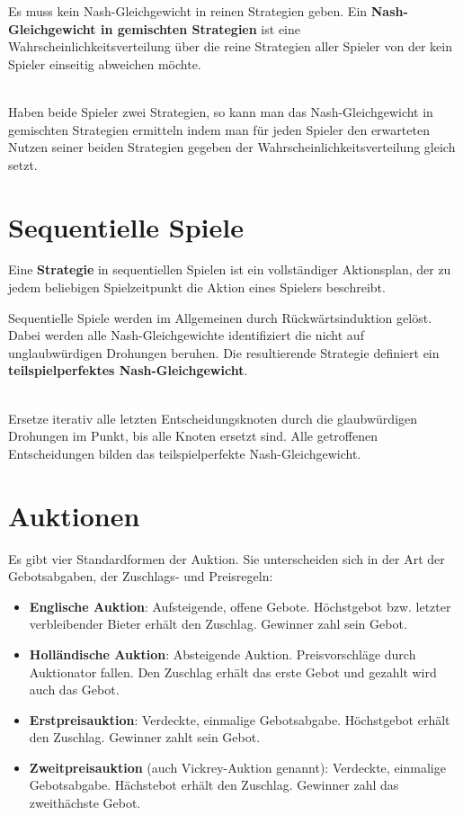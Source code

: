 Es muss kein Nash-Gleichgewicht in reinen Strategien geben. Ein \textbf{Nash-Gleichgewicht in gemischten Strategien} ist eine Wahrscheinlichkeitsverteilung über die reine Strategien aller Spieler von der kein Spieler einseitig abweichen möchte. 

\begin{kr} ~\\
	Haben beide Spieler zwei Strategien, so kann man das Nash-Gleichgewicht in gemischten Strategien ermitteln indem man für jeden Spieler den erwarteten Nutzen seiner beiden Strategien gegeben der Wahrscheinlichkeitsverteilung gleich setzt.
\end{kr}

\section{Sequentielle Spiele}

Eine \textbf{Strategie} in sequentiellen Spielen ist ein vollständiger Aktionsplan, der zu jedem beliebigen Spielzeitpunkt die Aktion eines Spielers beschreibt.

Sequentielle Spiele werden im Allgemeinen durch Rückwärtsinduktion gelöst. Dabei werden alle Nash-Gleichgewichte identifiziert die nicht auf unglaubwürdigen Drohungen beruhen. Die resultierende Strategie definiert ein \textbf{teilspielperfektes Nash-Gleichgewicht}.

\begin{kr} ~\\
	Ersetze iterativ alle letzten Entscheidungsknoten durch die glaubwürdigen Drohungen im Punkt, bis alle Knoten ersetzt sind. Alle getroffenen Entscheidungen bilden das teilspielperfekte Nash-Gleichgewicht.
\end{kr}

\section{Auktionen}

Es gibt vier Standardformen der Auktion. Sie unterscheiden sich in der Art der Gebotsabgaben, der Zuschlags- und Preisregeln:
\begin{itemize}
	\item \textbf{Englische Auktion}: Aufsteigende, offene Gebote. Höchstgebot bzw. letzter verbleibender Bieter erhält den Zuschlag. Gewinner zahl sein Gebot.
	\item \textbf{Holländische Auktion}: Absteigende Auktion. Preisvorschläge durch Auktionator fallen. Den Zuschlag erhält das erste Gebot und gezahlt wird auch das Gebot.
	\item \textbf{Erstpreisauktion}: Verdeckte, einmalige Gebotsabgabe. Höchstgebot erhält den Zuschlag. Gewinner zahlt sein Gebot.
	\item \textbf{Zweitpreisauktion} (auch Vickrey-Auktion genannt): Verdeckte, einmalige Gebotsabgabe. Hächstebot erhält den Zuschlag. Gewinner zahl das zweithächste Gebot.
\end{itemize}

